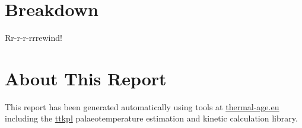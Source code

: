 \documentclass[11pt,a4paper]{report}
\begin{document}
\chapter{Breakdown}
Rr-r-r-rrrewind!

\appendix

\chapter{About This Report}
This report has been generated automatically using tools at \href{http://thermal-age.eu}{thermal-age.eu} including the \href{https://github.com/dhharker/ttkpl}{ttkpl} palaeotemperature estimation and kinetic calculation library.
\end{document}
